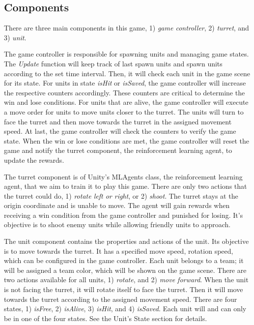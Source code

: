 \documentclass[conference]{IEEEtran}
\begin{document}
\subsection{Components}

There are three main components in this game, 1) \textit{game controller}, 2) \textit{turret}, and 3) \textit{unit}.

The game controller is responsible for spawning units and managing game states. The \textit{Update} function will keep track of last spawn units and spawn units according to the set time interval. Then, it will check each unit in the game scene for its state. For units in state \textit{isHit} or \textit{isSaved}, the game controller will increase the respective counters accordingly. These counters are critical to determine the win and lose conditions. For units that are alive, the game controller will execute a move order for units to move units closer to the turret. The units will turn to face the turret and then move towards the turret in the assigned movement speed. At last, the game controller will check the counters to verify the game state. When the win or lose conditions are met, the game controller will reset the game and notify the turret component, the reinforcement learning agent, to update the rewards.

The turret component is of Unity's MLAgents class, the reinforcement learning agent, that we aim to train it to play this game. There are only two actions that the turret could do, 1) \textit{rotate left or right}, or 2) \textit{shoot}. The turret stays at the origin coordinate and is unable to move. The agent will gain rewards when receiving a win condition from the game controller and punished for losing. It's objective is to shoot enemy units while allowing friendly units to approach.

The unit component contains the properties and actions of the unit. Its objective is to move towards the turret. It has a specified move speed, rotation speed, which can be configured in the game controller. Each unit belongs to a team; it will be assigned a team color, which will be shown on the game scene. There are two actions available for all units, 1) \textit{rotate}, and 2) \textit{move forward}. When the unit is not facing the turret, it will rotate itself to face the turret. Then it will move towards the turret according to the assigned movement speed. There are four states, 1) \textit{isFree}, 2) \textit{isAlive}, 3) \textit{isHit}, and 4) \textit{isSaved}. Each unit will and can only be in one of the four states. See the Unit's State section for details.
\end{document}
